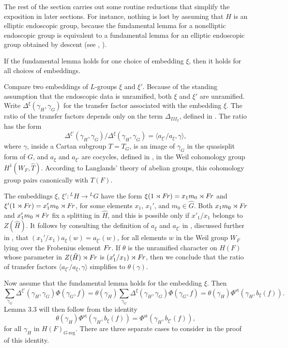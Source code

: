 The rest of the section carries out some routine
reductions that simplify the exposition in later
sections.  For instance, nothing is lost by assuming
that $H$ is an elliptic endoscopic group, because
the fundamental lemma for a nonelliptic endoscopic
group is equivalent to a fundamental lemma for
an elliptic endoscopic group obtained by descent (see \cite{H2}, \cite{LS2}).

  If the fundamental lemma holds
for one choice of embedding $\xi$, then it holds for all
choices of embeddings.
\endproclaim

Compare two embeddings of $L$-groups $\xi$ and $\xi'$.  Because
of the standing assumption that the endoscopic data is unramified,
both $\xi$ and $\xi'$ are unramified.
Write $\Delta^\xi(\gamma_H,\gamma_G)$ for
the transfer factor associated with the embedding $\xi$.
The ratio of the transfer factors depends only on the
term $\Delta_{III_2}$, defined in \cite{LS1}.  The ratio
has the form
$$\Delta^{\xi'}(\gamma_H,\gamma_G)/\Delta^{\xi}(\gamma_H,\gamma_G) =
   \langle a_{\xi'}/a_\xi,\gamma\rangle,$$
where $\gamma$, inside a Cartan subgroup $T=T_G$, is an image
of $\gamma_G$ in the quasisplit form of $G$, and $a_\xi$ and
$a_{\xi'}$ are cocycles, defined in \cite{LS1}, in the Weil cohomology
group $H^1(W_F,\hat T)$.  According to Langlands' theory of
abelian groups, this cohomology group pairs canonically
with $T(F)$.

The embeddings $\xi$, $\xi':{}^L\!H\to {}^L\!G$ have the form $\xi(1\rtimes \text{$F\hskip-.1em r$}) =
x_1m_0\rtimes \text{$F\hskip-.1em r$}$ and $\xi'(1\rtimes \text{$F\hskip-.1em r$}) = x_1'm_0\rtimes \text{$F\hskip-.1em r$}$,
for some elements $x_1$, $x_1'$, and  $m_0\in \hat G$.  Both $x_1m_0\rtimes\text{$F\hskip-.1em r$}$
and $x_1'm_0\rtimes \text{$F\hskip-.1em r$}$ fix a splitting in $\hat H$, and this
is possible only if $x'_1/x_1$ belongs to $Z(\hat H)$.  It follows by
consulting the definition of $a_\xi$ and $a_{\xi'}$ in \cite{LS1},
discussed further in \cite{H2},
that $(x_1'/x_1)a_\xi(w) = a_{\xi'}(w)$, for all elements $w$ in the
Weil group $W_F$ lying over the Frobenius element $\text{$F\hskip-.1em r$}$.  If
$\theta$ is the unramified character on $H(F)$ whose parameter
in $Z(\hat H)\rtimes \text{$F\hskip-.1em r$}$ is $(x_1'/x_1)\rtimes \text{$F\hskip-.1em r$}$, then we
conclude that the ratio of transfer factors 
$\langle a_{\xi'}/a_\xi,\gamma\rangle$ simplifies to $\theta(\gamma)$.

Now assume that the fundamental lemma holds for the
embedding $\xi$.  Then
$$\sum_{\gamma_G} \Delta^{\xi'}(\gamma_H,\gamma_G)
  \Phi(\gamma_G,f) = \theta(\gamma_H)
  \sum_{\gamma_G}\Delta^\xi(\gamma_H,\gamma_G)
  \Phi(\gamma_G,f) = \theta(\gamma_H)\Phi^{\text{st}}(\gamma_H,b_\xi(f)).$$
Lemma 3.3 will then follow from the identity
$$\theta(\gamma_H)\Phi^{\text{st}}(\gamma_H,b_\xi(f)) =
  \Phi^{\text{st}}(\gamma_H,b_{\xi'}(f)),\tag{*}$$
  for all $\gamma_H$ in $H(F)_{G\text{-reg}}$.
There are three separate cases to consider in the
proof of this identity.

